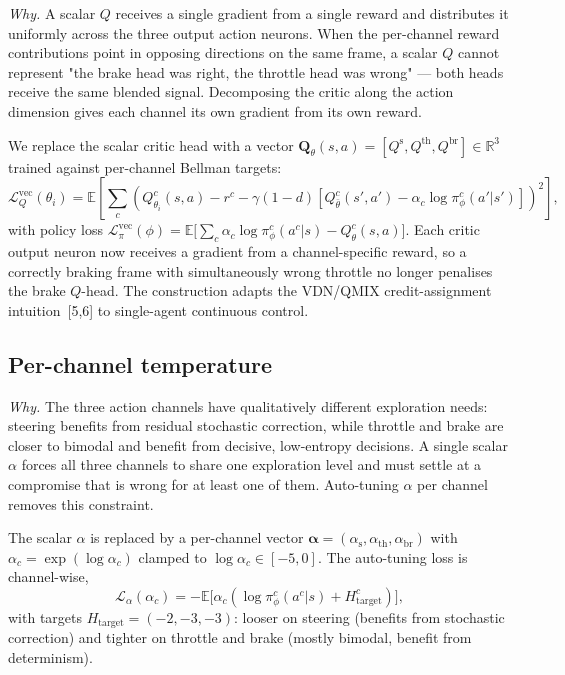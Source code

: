 \documentclass{article}
\begin{document}
\emph{Why.} A scalar $Q$ receives a single gradient from a single
reward and distributes it uniformly across the three output action
neurons. When the per-channel reward contributions point in opposing
directions on the same frame, a scalar $Q$ cannot represent "the
brake head was right, the throttle head was wrong" — both heads
receive the same blended signal. Decomposing the critic along the
action dimension gives each channel its own gradient from its own
reward.

We replace the scalar critic head with a vector
$\mathbf{Q}_\theta(s,a) = [Q^\mathrm{s}, Q^\mathrm{th}, Q^\mathrm{br}] \in \mathbb{R}^3$
trained against per-channel Bellman targets:
\begin{equation}
\mathcal{L}_Q^{\mathrm{vec}}(\theta_i) = \mathbb{E}
\!\left[\sum_{c}
  \left(Q^c_{\theta_i}(s,a) - r^c - \gamma(1{-}d)\!\left[Q^c_{\bar\theta}(s', a') - \alpha_c \log \pi^c_\phi(a'|s')\right]\right)^2\right],
\label{eq:vec-q}
\end{equation}
with policy loss
$\mathcal{L}_\pi^{\mathrm{vec}}(\phi) = \mathbb{E}\bigl[\sum_c \alpha_c \log \pi^c_\phi(a^c|s) - Q^c_\theta(s, a)\bigr]$.
Each critic output neuron now receives a gradient from a
channel-specific reward, so a correctly braking frame with
simultaneously wrong throttle no longer penalises the brake $Q$-head.
The construction adapts the VDN/QMIX credit-assignment intuition~[5,6]
to single-agent continuous control.

\subsection{Per-channel temperature}
\label{sec:per-channel-alpha}

\emph{Why.} The three action channels have qualitatively different
exploration needs: steering benefits from residual stochastic
correction, while throttle and brake are closer to bimodal and
benefit from decisive, low-entropy decisions. A single scalar
$\alpha$ forces all three channels to share one exploration level
and must settle at a compromise that is wrong for at least one of
them. Auto-tuning $\alpha$ per channel removes this constraint.

The scalar $\alpha$ is replaced by a per-channel vector
$\boldsymbol{\alpha} = (\alpha_\mathrm{s}, \alpha_\mathrm{th}, \alpha_\mathrm{br})$
with $\alpha_c = \exp(\log\alpha_c)$ clamped to
$\log\alpha_c \in [-5, 0]$. The auto-tuning loss is channel-wise,
\begin{equation}
\mathcal{L}_\alpha(\alpha_c) = -\mathbb{E}\bigl[\alpha_c(\log\pi^c_\phi(a^c|s) + H^c_\text{target})\bigr],
\label{eq:per-channel-alpha}
\end{equation}
with targets $H_\text{target} = (-2, -3, -3)$: looser on steering
(benefits from stochastic correction) and tighter on throttle and
brake (mostly bimodal, benefit from determinism).
\end{document}
